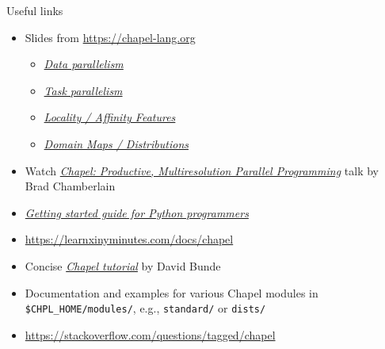 \documentclass[10pt,xcolor=pdftex,dvipsnames,table]{beamer}
\newcommand{\tc}{\textcolor}
\begin{document}
\begin{frame}{Useful links}
  \begin{itemize}\setlength{\itemsep}{3mm}
  \item Slides from \url{https://chapel-lang.org}
    \begin{itemize}\setlength{\itemsep}{0.5mm}
    \item \href{http://chapel.cray.com/tutorials/ACCU2017/03-DataPar.pdf}{\tc{Mahogany}{\it Data
      parallelism}}
    \item \href{https://chapel-lang.org/tutorials/ACCU2017/04-TaskPar.pdf}{\tc{Mahogany}{\it Task
        parallelism}}
    \item \href{https://chapel-lang.org/tutorials/ACCU2017/05-Locality.pdf}{\tc{Mahogany}{\it
        Locality / Affinity Features}}
    \item \href{https://chapel-lang.org/tutorials/ACCU2017/06-DomainMaps.pdf}{\tc{Mahogany}{\it
        Domain Maps / Distributions}}
    \end{itemize}
  \item Watch \href{https://youtu.be/0DjIdRJIqRY}{\tc{Mahogany}{\it Chapel: Productive, Multiresolution
      Parallel Programming}} talk by Brad Chamberlain
  \item \href{http://chapel-for-python-programmers.readthedocs.io/basics.html}{\tc{Mahogany}{\it
      Getting started guide for Python programmers}}
  \item \url{https://learnxinyminutes.com/docs/chapel}
  \item Concise \href{http://faculty.knox.edu/dbunde/teaching/chapel/tutorial-1.9.html}{\tc{Mahogany}{\it
      Chapel tutorial}} by David Bunde
  \item Documentation and examples for various Chapel modules in \texttt{\$CHPL\_HOME/modules/}, e.g.,
    \texttt{standard/} or \texttt{dists/}
  \item \url{https://stackoverflow.com/questions/tagged/chapel}
  \end{itemize}
\end{frame}
\end{document}
